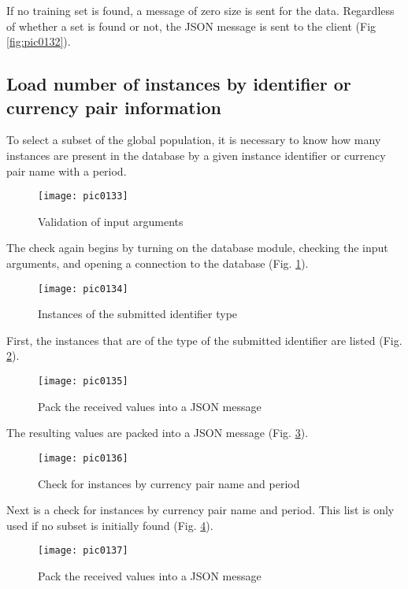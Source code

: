 If no training set is found, a message of zero size is sent for the data. Regardless of whether a set is found or not, the JSON message is sent to the client (Fig \ref{fig:pic0132}).

\subsection{Load number of instances by identifier or currency pair information}

To select a subset of the global population, it is necessary to know how many instances are present in the database by a given instance identifier or currency pair name with a period.

\begin{figure}[h]
\centering
\texttt{[image: pic0133]}
\caption{Validation of input arguments}
\label{fig:pic0133}
\end{figure}
\FloatBarrier

The check again begins by turning on the database module, checking the input arguments, and opening a connection to the database (Fig. \ref{fig:pic0133}).

\begin{figure}[h]
\centering
\texttt{[image: pic0134]}
\caption{Instances of the submitted identifier type}
\label{fig:pic0134}
\end{figure}
\FloatBarrier

First, the instances that are of the type of the submitted identifier are listed (Fig. \ref{fig:pic0134}).

\begin{figure}[h]
\centering
\texttt{[image: pic0135]}
\caption{Pack the received values into a JSON message}
\label{fig:pic0135}
\end{figure}
\FloatBarrier

The resulting values are packed into a JSON message (Fig. \ref{fig:pic0135}).

\begin{figure}[h]
\centering
\texttt{[image: pic0136]}
\caption{Check for instances by currency pair name and period}
\label{fig:pic0136}
\end{figure}
\FloatBarrier

Next is a check for instances by currency pair name and period. This list is only used if no subset is initially found (Fig. \ref{fig:pic0136}).

\begin{figure}[h]
\centering
\texttt{[image: pic0137]}
\caption{Pack the received values into a JSON message}
\label{fig:pic0137}
\end{figure}
\FloatBarrier


